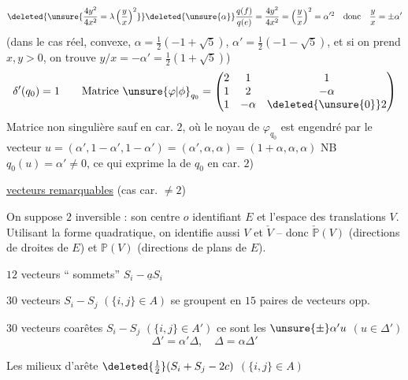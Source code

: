 \[
\deleted{\unsure{\frac{4y^2}{4x^2}=\lambda\left(\frac yx\right)^2}}\deleted{\unsure{\alpha}}\frac{q(f)}{q(e)}=\frac{4y^2}{4x^2}=\left(\frac yx\right)^2=\alpha'^2\quad\text{donc}\quad\frac yx=\pm\alpha'
\]
(dans le cas réel,  convexe, $\alpha=\frac12(-1+\sqrt5)$, $\alpha'=\frac12(-1-\sqrt5)$,  et si on prend $x,y>0$, on trouve $y/x=-\alpha'=\frac12(1+\sqrt5)$)
\[
\delta'(q_0)=1\qquad\text{Matrice }\unsure{\varphi|\phi}_{q_0}=\begin{pmatrix}2&1&1\\1&2&-\alpha\\1&-\alpha&\deleted{\unsure{0}}2\end{pmatrix}
\]
Matrice non singulière sauf en car. $2$, où le noyau de $\varphi_{q_0}$ est engendré par le vecteur $u=(\alpha',1-\alpha',1-\alpha')=(\alpha',\alpha,\alpha)=(1+\alpha,\alpha,\alpha)$ NB $q_0(u)=\alpha'\ne0$, ce qui exprime la  de $q_0$ en car. $2$)

\uline{vecteurs remarquables}  (cas car. $\ne2$)

On suppose $2$ inversible : son centre $o$ identifiant $E$ et l'espace des translations $V$. Utilisant la forme quadratique, on identifie aussi $V$ et $\check V$ -- donc $\check{\mathbb P}(V)$ (directions de droites de $E$) et $\mathbb P(V)$ (directions de plans de $E$).

$12$ vecteurs `` sommets'' $\boxed{S_i-\underline aS_i}$

\margin{$\Delta$}
$30$ vecteurs   $S_i-S_j$ $(\{i,j\}\in A)$ se groupent en $15$ paires de vecteurs opp.

$30$ vecteurs coarêtes $S_i-S_j$ $(\{i,j\}\in A')$ ce sont les $\unsure{\pm}\alpha'u$ $(u\in\Delta')$
\[
\boxed{\Delta'=\alpha'\Delta,\quad\Delta=\alpha\Delta'}
\]
\diagram{\begin{tikzcd}[ampersand replacement=\&]
{}\arrow[r]\&{}\\
{}\arrow[u]\arrow[r]\&{}\arrow[u]
\end{tikzcd}}

\margin{$\left[\begin{matrix}\mathcal A\\\mathcal A'\end{matrix}\right.$}
Les  milieux d'arête $\deleted{\tfrac12}(S_i+S_j-2c)$ $(\{i,j\}\in A)$


